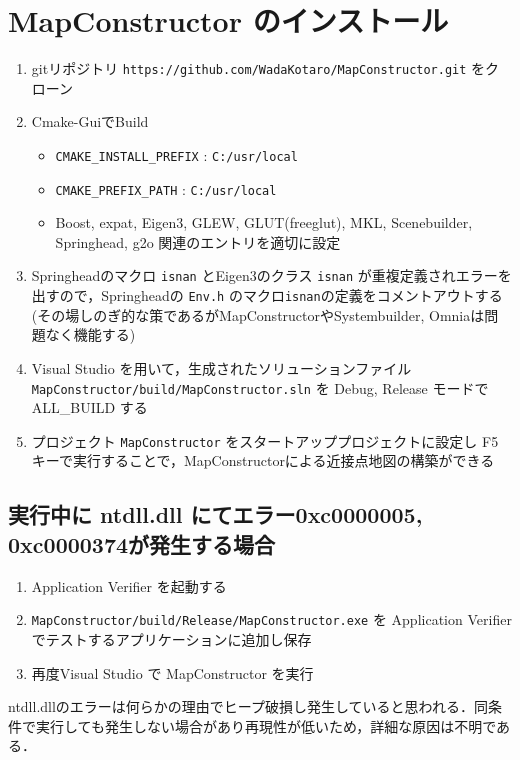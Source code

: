 \documentclass[dvipdfmx]{jsarticle}
\begin{document}
\section{MapConstructor のインストール}
\begin{enumerate}
	\item gitリポジトリ \verb|https://github.com/WadaKotaro/MapConstructor.git| をクローン
	\item Cmake-GuiでBuild
	\begin{itemize}
		\item \verb|CMAKE_INSTALL_PREFIX| : \verb|C:/usr/local|
		\item \verb|CMAKE_PREFIX_PATH| : \verb|C:/usr/local|
		\item Boost, expat, Eigen3, GLEW, GLUT(freeglut), MKL, Scenebuilder, Springhead, g2o 関連のエントリを適切に設定
	\end{itemize}
	\item Springheadのマクロ \verb|isnan| とEigen3のクラス \verb|isnan| が重複定義されエラーを出すので，Springheadの \verb|Env.h| のマクロ\verb|isnan|の定義をコメントアウトする\\
		(その場しのぎ的な策であるがMapConstructorやSystembuilder, Omniaは問題なく機能する)
	\item Visual Studio を用いて，生成されたソリューションファイル\\ \verb|MapConstructor/build/MapConstructor.sln| を Debug, Release モードで ALL\_BUILD する
	\item プロジェクト \verb|MapConstructor| をスタートアッププロジェクトに設定し F5 キーで実行することで，MapConstructorによる近接点地図の構築ができる
\end{enumerate}

\subsection{実行中に ntdll.dll にてエラー0xc0000005, 0xc0000374が発生する場合}
\begin{enumerate}
	\item Application Verifier を起動する
	\item \verb|MapConstructor/build/Release/MapConstructor.exe| を Application Verifier でテストするアプリケーションに追加し保存
	\item 再度Visual Studio で MapConstructor を実行
\end{enumerate}
ntdll.dllのエラーは何らかの理由でヒープ破損し発生していると思われる．同条件で実行しても発生しない場合があり再現性が低いため，詳細な原因は不明である．
\end{document}
